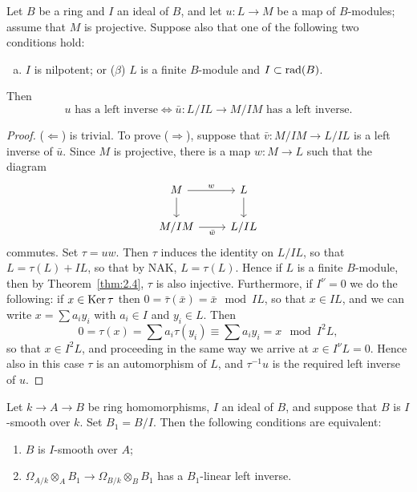 \begin{lemma}\label{lem:28.2}
Let $B$ be a ring and $I$ an ideal of $B$, and let $u\colon L \to M$ be a map of
$B$-modules; assume that $M$ is projective. Suppose also that one of the
following two conditions hold:
\begin{enumerate}[(a)]
  \item $I$ is nilpotent;
or ($\beta$) $L$ is a finite $B$-module and $I \subset \operatorname{rad}(B)$.
\end{enumerate}
Then
\[
  u \text{ has a left inverse} \iff \bar{u}\colon L/IL \to M/IM \text{ has a left inverse}.
\]
\end{lemma}

\begin{proof}
($\Leftarrow$) is trivial. To prove ($\Rightarrow$), suppose that $\bar{v}\colon M/IM \to L/IL$ is a
left inverse of $\bar{u}$. Since $M$ is projective, there is a map $w\colon M \to L$ such
that the diagram
\[
\begin{tikzcd}
M \arrow[r, "w"] \arrow[d] & L \arrow[d] \\
M/IM \arrow[r, "\bar{w}"'] & L/IL
\end{tikzcd}
\]
commutes. Set $\tau = uw$. Then $\tau$ induces the identity on $L/IL$, so that
$L = \tau(L) + IL$, so that by NAK, $L = \tau(L)$. Hence if $L$ is a finite $B$-module,
then by Theorem~\ref{thm:2.4}, $\tau$ is also injective. Furthermore, if $I^\nu = 0$ we do
the following: if $x \in \operatorname{Ker} \tau$ then $0 = \bar{\tau}(\bar{x}) = \bar{x} \mod IL$, so that $x \in IL$, and
we can write $x = \sum a_i y_i$ with $a_i \in I$ and $y_i \in L$. Then
\[
  0 = \tau(x) = \sum a_i \tau(y_i) \equiv \sum a_iy_i = x \mod I^2L,
\]
so that $x \in I^2L$, and proceeding in the same way we arrive at
$x \in I^\nu L = 0$. Hence also in this case $\tau$ is an automorphism of $L$, and
$\tau^{-1}u$ is the required left inverse of $u$.
\end{proof}

\begin{theorem}\label{thm:28.6}
Let $k \to A \to B$ be ring homomorphisms, $I$ an ideal of $B$, and suppose that $B$ is
$I$-smooth over $k$. Set $B_1 = B/I$. Then the following conditions are equivalent:
\begin{enumerate}[(1)]
  \item $B$ is $I$-smooth over $A$;
  \item $\Omega_{A/k} \otimes_A B_1 \to \Omega_{B/k} \otimes_B B_1$ has a $B_1$-linear left inverse.
\end{enumerate}
\end{theorem}


